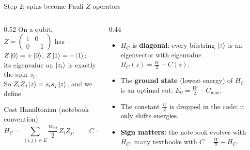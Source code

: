 \documentclass[aspectratio=169,11pt]{beamer}
\newcommand{\hl}[1]{{\color{qorange}\textbf{#1}}}
\newcommand{\key}[1]{{\color{qdark}\textbf{#1}}}
\begin{document}
\begin{frame}{Step 2: spins become Pauli-$Z$ operators}
  \begin{columns}[T]
    \begin{column}{0.52\textwidth}
      On a qubit, $Z = \begin{pmatrix}1&0\\0&-1\end{pmatrix}$ has $Z\ket0 = +\ket0$, $Z\ket1 = -\ket1$:\\
      its eigenvalue on $\ket{z_i}$ is exactly the spin $s_i$.\\[2mm]
      So $Z_iZ_j\ket z = s_is_j\ket z$, and we define
      \begin{block}{Cost Hamiltonian (notebook convention)}
        \[ H_C = \sum_{(i,j)\in E} \frac{w_{ij}}{2}\, Z_iZ_j, \qquad C = \frac W2\,I - H_C . \]
      \end{block}
    \end{column}
    \begin{column}{0.44\textwidth}
      \begin{itemize}
        \item $H_C$ is \key{diagonal}: every bitstring $\ket z$ is an eigenvector with eigenvalue $H_C(z) = \frac W2 - C(z)$.
        \item The \key{ground state} (lowest energy) of $H_C$ is an optimal cut: $E_0 = \frac W2 - C_{\max}$.
        \item The constant $\frac W2$ is dropped in the code; it only shifts energies.
        \item \hl{Sign matters:} the notebook evolves with $H_C$, many textbooks with $C = \frac W2 - H_C$.
      \end{itemize}
    \end{column}
  \end{columns}
\end{frame}
\end{document}
